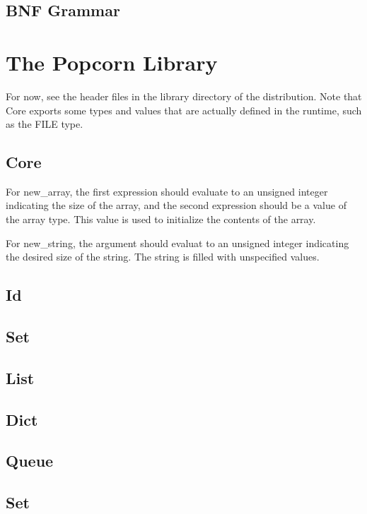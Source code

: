 \documentclass[titlepage,10pt]{article}
\begin{document}
\subsection{BNF Grammar}


\section{The Popcorn Library\label{library}}

For now, see the header files in the library directory of the
distribution.  Note that Core exports some types and values that are
actually defined in the runtime, such as the FILE type.


\subsection{Core}

For new{\_}array, the first expression should evaluate to an unsigned
integer indicating the size of the array, and the second expression
should be a value of the array type.  This value is used to initialize
the contents of the array.

For new{\_}string, the argument should evaluat to an unsigned integer
indicating the desired size of the string.  The string is filled with
unspecified values.


\subsection{Id}


\subsection{Set}


\subsection{List}


\subsection{Dict}


\subsection{Queue}


\subsection{Set}
\end{document}
